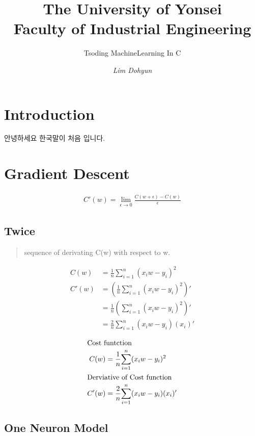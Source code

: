 \documentclass{article}
\title{\textbf{The University of Yonsei
\\{\Large Faculty of Industrial Engineering}}}
\subtitle{Tsoding MachineLearning In C}
\author{\emph{Lim Dohyun}}
\begin{document}
\maketitle
\section{Introduction}
안녕하세요 한국말이 처음 입니다.

\section{Gradient Descent}

\begin{align}
    C'(w) = \lim_{\epsilon \to 0}\frac{C(w + \epsilon) -C(w)}{\epsilon}
\end{align}

\subsection{Twice}
\begin{verse}
    sequence of derivating C(w) with respect to w.
\end{verse}
\begin{align}
   C(w) &= \frac{1}{n}{\sum_{i=1}^{n}(x_iw - y_i)^2} \\
   C'(w) &= \left(\frac{1}{n}{\sum_{i=1}^{n}(x_iw - y_i)^2}\right)' \\
   &= \frac{1}{n}\left({\sum_{i=1}^{n}(x_iw - y_i)^2}\right)' \\
   &= \frac{2}{n}{\sum_{i=1}^{n}(x_iw - y_i)(x_i)'}
\end{align}

\begin{align}
    \shortintertext{Cost funtction}
    C(w) &= \frac{1}{n}{\sum_{i=1}^{n}(x_iw - y_i)^2} \\
    \shortintertext{Derviative of Cost function}
    C'(w) &= \frac{2}{n}{\sum_{i=1}^{n}(x_iw - y_i)(x_i)'}
\end{align} 

    \bigskip

\subsection{One Neuron Model}

\def\d{1.5}

\begin{center}
\end{center}
\end{document}
